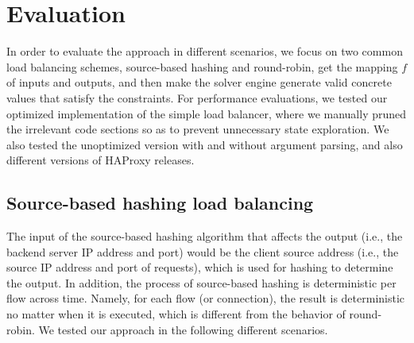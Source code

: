 \section{Evaluation}

In order to evaluate the approach in different scenarios, we focus on two common
load balancing schemes, source-based hashing and round-robin, get the mapping
$f$ of inputs and outputs, and then make the solver engine generate valid
concrete values that satisfy the constraints. For performance evaluations, we
tested our optimized implementation of the simple load balancer, where we
manually pruned the irrelevant code sections so as to prevent unnecessary state
exploration. We also tested the unoptimized version with and without argument
parsing, and also different versions of HAProxy releases.


\subsection{Source-based hashing load balancing}

The input of the source-based hashing algorithm that affects the output (i.e.,
the backend server IP address and port) would be the client source address
(i.e., the source IP address and port of requests), which is used for hashing to
determine the output. In addition, the process of source-based hashing is
deterministic per flow across time. Namely, for each flow (or connection), the
result is deterministic no matter when it is executed, which is different from
the behavior of round-robin. We tested our approach in the following different
scenarios.

